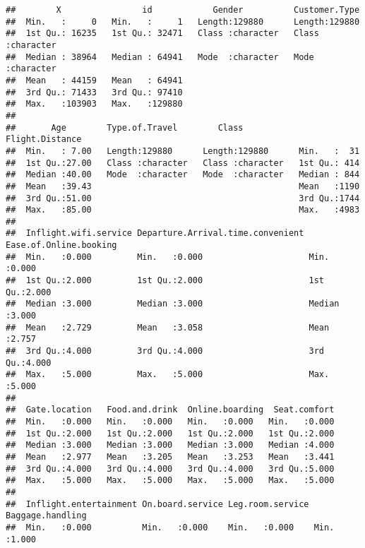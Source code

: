 \documentclass[
]{article}
\begin{document}
\begin{verbatim}
##        X                id            Gender          Customer.Type     
##  Min.   :     0   Min.   :     1   Length:129880      Length:129880     
##  1st Qu.: 16235   1st Qu.: 32471   Class :character   Class :character  
##  Median : 38964   Median : 64941   Mode  :character   Mode  :character  
##  Mean   : 44159   Mean   : 64941                                        
##  3rd Qu.: 71433   3rd Qu.: 97410                                        
##  Max.   :103903   Max.   :129880                                        
##                                                                         
##       Age        Type.of.Travel        Class           Flight.Distance
##  Min.   : 7.00   Length:129880      Length:129880      Min.   :  31   
##  1st Qu.:27.00   Class :character   Class :character   1st Qu.: 414   
##  Median :40.00   Mode  :character   Mode  :character   Median : 844   
##  Mean   :39.43                                         Mean   :1190   
##  3rd Qu.:51.00                                         3rd Qu.:1744   
##  Max.   :85.00                                         Max.   :4983   
##                                                                       
##  Inflight.wifi.service Departure.Arrival.time.convenient Ease.of.Online.booking
##  Min.   :0.000         Min.   :0.000                     Min.   :0.000         
##  1st Qu.:2.000         1st Qu.:2.000                     1st Qu.:2.000         
##  Median :3.000         Median :3.000                     Median :3.000         
##  Mean   :2.729         Mean   :3.058                     Mean   :2.757         
##  3rd Qu.:4.000         3rd Qu.:4.000                     3rd Qu.:4.000         
##  Max.   :5.000         Max.   :5.000                     Max.   :5.000         
##                                                                                
##  Gate.location   Food.and.drink  Online.boarding  Seat.comfort  
##  Min.   :0.000   Min.   :0.000   Min.   :0.000   Min.   :0.000  
##  1st Qu.:2.000   1st Qu.:2.000   1st Qu.:2.000   1st Qu.:2.000  
##  Median :3.000   Median :3.000   Median :3.000   Median :4.000  
##  Mean   :2.977   Mean   :3.205   Mean   :3.253   Mean   :3.441  
##  3rd Qu.:4.000   3rd Qu.:4.000   3rd Qu.:4.000   3rd Qu.:5.000  
##  Max.   :5.000   Max.   :5.000   Max.   :5.000   Max.   :5.000  
##                                                                 
##  Inflight.entertainment On.board.service Leg.room.service Baggage.handling
##  Min.   :0.000          Min.   :0.000    Min.   :0.000    Min.   :1.000   

\end{verbatim}
\end{document}
